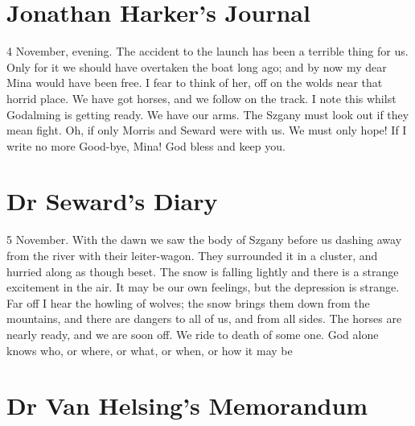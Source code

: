 \section{Jonathan Harker's Journal}

\begin{diary}{4 November, evening.}
The accident to the launch has been a terrible thing for us. Only for it we should have overtaken the boat long ago; and by now my dear Mina would have been free. I fear to think of her, off on the wolds near that horrid place. We have got horses, and we follow on the track. I note this whilst Godalming is getting ready. We have our arms. The Szgany must look out if they mean fight. Oh, if only Morris and Seward were with us. We must only hope! If I write no more Good-bye, Mina! God bless and keep you.
	\end{diary}


\section{Dr Seward's Diary}

\begin{diary}{5 November.}
With the dawn we saw the body of Szgany before us dashing away from the river with their leiter-wagon. They surrounded it in a cluster, and hurried along as though beset. The snow is falling lightly and there is a strange excitement in the air. It may be our own feelings, but the depression is strange. Far off I hear the howling of wolves; the snow brings them down from the mountains, and there are dangers to all of us, and from all sides. The horses are nearly ready, and we are soon off. We ride to death of some one. God alone knows who, or where, or what, or when, or how it may be
	\end{diary}

\section{Dr Van Helsing's Memorandum}


